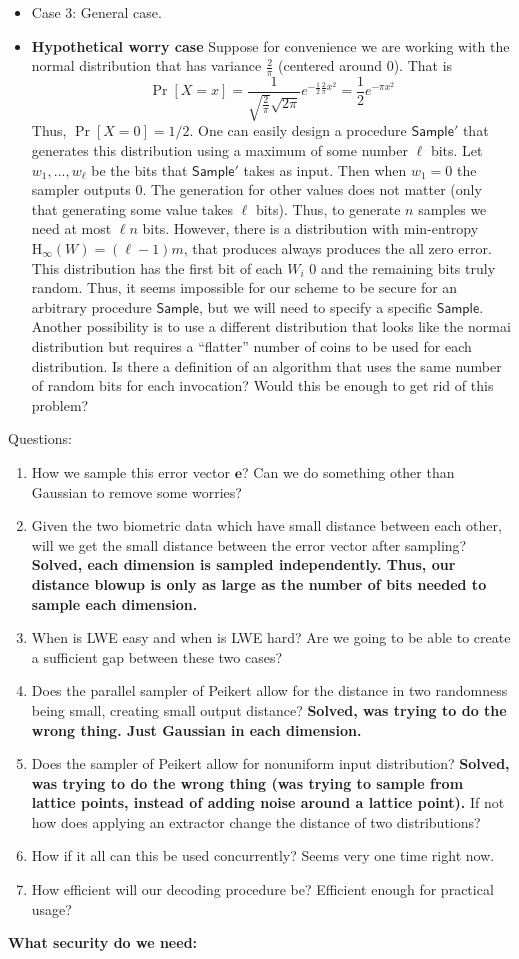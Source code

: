 \documentclass[11pt]{article}
\newcommand{\class}[1]{{\ensuremath{\mathsf{#1}}}}
\newcommand{\vect}[1]{\ensuremath{\textbf{#1}}}
\newcommand{\sample}{\ensuremath{\class{Sample}}\xspace}
\newcommand{\Hoo}{\mathrm{H}_\infty}
\begin{document}
{\begin{itemize}
\item Case 3: General case.
\item \textbf{Hypothetical worry case}  Suppose for convenience we are working with the normal distribution that has variance $\frac{2}{\pi}$ (centered around 0).  That is 
\[
\Pr[X=x] = \frac{1}{\sqrt{\frac{2}{\pi}}\sqrt{2\pi}}e^{-\frac{1}{2}{\frac{2}{\pi}x^2}}=\frac{1}{2}e^{-\pi x^2}
\]
Thus, $\Pr[X=0] =1/2$.  One can easily design a procedure $\sample'$ that generates this distribution using a maximum of some number $\ell$ bits.  Let $w_1,...,w_\ell$ be the bits that $\sample'$ takes as input.  Then when $w_1=0$ the sampler outputs $0$.  The generation for other values does not matter (only that generating some value takes $\ell$ bits).  Thus, to generate $n$ samples we need at most $\ell n$ bits.  However, there is a distribution with min-entropy $\Hoo(W)=(\ell -1) m$, that produces always produces the all zero error.  This distribution has the first bit of each $W_i$ 0 and the remaining bits truly random.  Thus, it seems impossible for our scheme to be secure for an arbitrary procedure \sample, but we will need to specify a specific \sample.  Another possibility is to use a different distribution that looks like the normai distribution but requires a ``flatter'' number of coins to be used for each distribution.  Is there a definition of an algorithm that uses the same number of random bits for each invocation?  Would this be enough to get rid of this problem?
\end{itemize}
Questions: 
\begin{enumerate}
\item How we sample this error vector $\vect{e}$?  Can we do something other than Gaussian to remove some worries?
\item Given the two biometric data which have small distance between each other, will we get the small distance between the error vector after sampling?
\textbf{Solved, each dimension is sampled independently.  Thus, our distance blowup is only as large as the number of bits needed to sample each dimension.}
\item When is LWE easy and when is LWE hard?  Are we going to be able to create a sufficient gap between these two cases?
\item Does the parallel sampler of Peikert allow for the distance in two randomness being small, creating small output distance?
\textbf{Solved, was trying to do the wrong thing.  Just Gaussian in each dimension.}
\item Does the sampler of Peikert allow for nonuniform input distribution?
\textbf{Solved, was trying to do the wrong thing (was trying to sample from lattice points, instead of adding noise around a lattice point).}
\subitem If not how does applying an extractor change the distance of two distributions?
\item How if it all can this be used concurrently?  Seems very one time right now.
\item How efficient will our decoding procedure be?  Efficient enough for practical usage?
\end{enumerate}

\textbf{What security do we need: }
}
\end{document}
